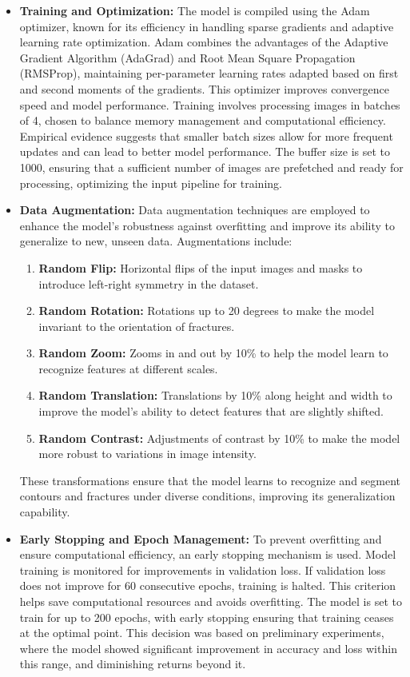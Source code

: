 \documentclass[preprint,12pt]{elsarticle}
\begin{document}
\begin{itemize}
    \item \textbf{Training and Optimization:} The model is compiled using the Adam optimizer, known for its efficiency in handling sparse gradients and adaptive learning rate optimization. Adam combines the advantages of the Adaptive Gradient Algorithm (AdaGrad) and Root Mean Square Propagation (RMSProp), maintaining per-parameter learning rates adapted based on first and second moments of the gradients. This optimizer improves convergence speed and model performance. Training involves processing images in batches of 4, chosen to balance memory management and computational efficiency. Empirical evidence suggests that smaller batch sizes allow for more frequent updates and can lead to better model performance. The buffer size is set to 1000, ensuring that a sufficient number of images are prefetched and ready for processing, optimizing the input pipeline for training.

    \item \textbf{Data Augmentation:} Data augmentation techniques are employed to enhance the model's robustness against overfitting and improve its ability to generalize to new, unseen data. Augmentations include:
        \begin{enumerate}
            \item \textbf{Random Flip:} Horizontal flips of the input images and masks to introduce left-right symmetry in the dataset.
            \item \textbf{Random Rotation:} Rotations up to 20 degrees to make the model invariant to the orientation of fractures.
            \item \textbf{Random Zoom:} Zooms in and out by 10\% to help the model learn to recognize features at different scales.
            \item \textbf{Random Translation:} Translations by 10\% along height and width to improve the model’s ability to detect features that are slightly shifted.
            \item \textbf{Random Contrast:} Adjustments of contrast by 10\% to make the model more robust to variations in image intensity.
        \end{enumerate}
        These transformations ensure that the model learns to recognize and segment contours and fractures under diverse conditions, improving its generalization capability.

    \item \textbf{Early Stopping and Epoch Management:} To prevent overfitting and ensure computational efficiency, an early stopping mechanism is used. Model training is monitored for improvements in validation loss. If validation loss does not improve for 60 consecutive epochs, training is halted. This criterion helps save computational resources and avoids overfitting. The model is set to train for up to 200 epochs, with early stopping ensuring that training ceases at the optimal point. This decision was based on preliminary experiments, where the model showed significant improvement in accuracy and loss within this range, and diminishing returns beyond it.
\end{itemize}
\end{document}
